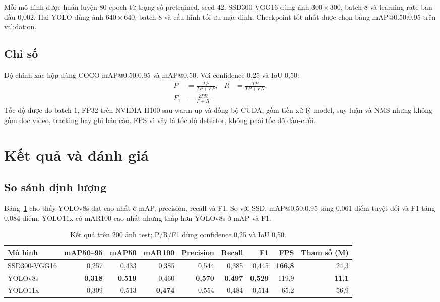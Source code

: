 \documentclass[11pt,a4paper]{article}
\begin{document}
Mỗi mô hình được huấn luyện 80 epoch từ trọng số pretrained, seed 42. SSD300-VGG16 dùng ảnh $300\times300$, batch 8 và learning rate ban đầu 0,002. Hai YOLO dùng ảnh $640\times640$, batch 8 và cấu hình tối ưu mặc định. Checkpoint tốt nhất được chọn bằng mAP@0.50:0.95 trên validation.

\subsection{Chỉ số}
Độ chính xác hộp dùng COCO mAP@0.50:0.95 và mAP@0.50. Với confidence 0,25 và IoU 0,50:
\begin{align}
P&=\frac{TP}{TP+FP}, & R&=\frac{TP}{TP+FN},\\
F_1&=\frac{2PR}{P+R}.&&
\end{align}
Tốc độ được đo batch 1, FP32 trên NVIDIA H100 sau warm-up và đồng bộ CUDA, gồm tiền xử lý model, suy luận và NMS nhưng không gồm đọc video, tracking hay ghi báo cáo. FPS vì vậy là tốc độ detector, không phải tốc độ đầu-cuối.

\section{Kết quả và đánh giá}
\subsection{So sánh định lượng}
Bảng~\ref{tab:results} cho thấy YOLOv8s đạt cao nhất ở mAP, precision, recall và F1. So với SSD, mAP@0.50:0.95 tăng 0,061 điểm tuyệt đối và F1 tăng 0,084 điểm. YOLO11x có mAR100 cao nhất nhưng thấp hơn YOLOv8s ở mAP và F1.

\begin{table}[t]
\centering\small
\begin{tabular}{@{}lrrrrrrrr@{}}
\toprule
Mô hình & mAP50--95 & mAP50 & mAR100 & Precision & Recall & F1 & FPS & Tham số (M) \\
\midrule
SSD300-VGG16 & 0,257 & 0,433 & 0,385 & 0,544 & 0,385 & 0,445 & \textbf{166,8} & 24,3 \\
YOLOv8s & \textbf{0,318} & \textbf{0,519} & 0,460 & \textbf{0,570} & \textbf{0,497} & \textbf{0,529} & 119,9 & \textbf{11,1} \\
YOLO11x & 0,309 & 0,513 & \textbf{0,474} & 0,554 & 0,484 & 0,514 & 65,2 & 56,9 \\
\bottomrule
\end{tabular}
\caption{Kết quả trên 200 ảnh test; P/R/F1 dùng confidence 0,25 và IoU 0,50.}
\label{tab:results}
\end{table}
\end{document}
